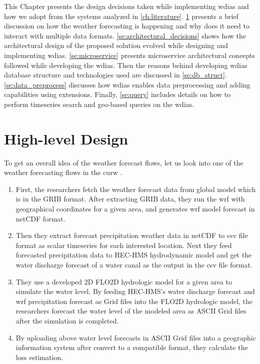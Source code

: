 This Chapter presents the design decisions taken while implementing \acrfull{wdias} and how we adopt from the systems analyzed in \cref{ch:literature}.
\cref{se:high_level_design} presents a brief discussion on how  the weather forecasting is happening and why does it need to interact with multiple data formats.
\cref{se:architectural_decisions} shows how the architectural design of the proposed solution evolved while designing and implementing \acrshort{wdias}.
\cref{se:microservice} presents microservice architectural concepts followed while developing the \acrshort{wdias}. Then the reasons behind developing \acrshort{wdias} database structure and technologies used are discussed in  \cref{se:db_struct}.
\cref{se:data_preprocess} discusses how \acrshort{wdias} enables data preprocessing and adding capabilities using extensions. Finally, \cref{se:query} includes details on how to perform timeseries search and geo-based queries on the \acrshort{wdias}.


\section{High-level Design}
\label{se:high_level_design}

To get an overall idea of the weather forecast flows, let us look into one of the weather forecasting flows in the \acrshort{curw} \cite{CUrWSL2017Lanka}.

\begin{enumerate}
    \item First, the researchers fetch the weather forecast data from global model which is in the \acrshort{GRIB} format. After extracting \acrshort{GRIB} data, they run the \acrshort{wrf} with geographical coordinates for a given area, and generates \acrshort{wrf} model forecast in \acrshort{netCDF} format.
    \item Then they extract forecast precipitation weather data in \acrshort{netCDF} to \acrshort{csv} file format as scalar timeseries for each interested location. Next they feed forecasted precipitation data to HEC-HMS hydrodynamic model and get the water discharge forecast of a water canal as the output in the \acrshort{csv} file format.
    \item They use a developed 2D FLO2D hydrologic model for a given area to simulate the water level. By feeding HEC-HMS's water discharge forecast and \acrshort{wrf} precipitation forecast as Grid files into the FLO2D hydrologic model, the researchers forecast the water level of the modeled area as ASCII Grid files after the simulation is completed.
    \item By uploading above water level forecasts in ASCII Grid files into a geographic information system after convert to a compatible format, they calculate the loss estimation.
\end{enumerate}

